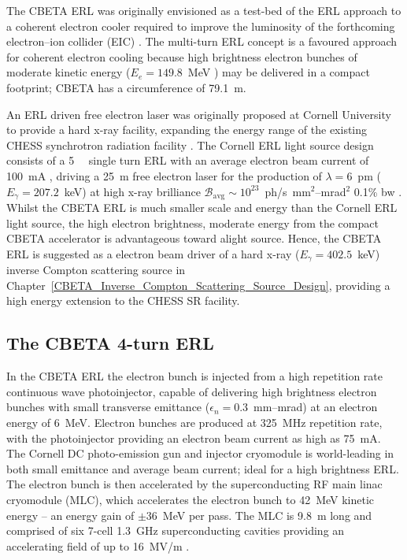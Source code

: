 \documentclass[../main.tex]{subfiles}
\begin{document}
The CBETA ERL was originally envisioned as a test-bed of the ERL approach to a coherent electron cooler \cite{derbenev1991coherent,litvinenko2009coherent} required to improve the luminosity of the forthcoming electron--ion collider (EIC) \cite{willeke2021electron}. The multi-turn ERL concept is a favoured approach for coherent electron cooling because high brightness electron bunches of moderate kinetic energy ($E_{e} = 149.8$~\si{\mega\electronvolt} \cite{willeke2021electron}) may be delivered in a compact footprint; CBETA has a circumference of 79.1~\si{\meter}. 

An ERL driven free electron laser \cite{bazarov2003lattice,gruner2001study,bilderback2006status} was originally proposed at Cornell University to provide a hard x-ray facility, expanding the energy range of the existing CHESS synchrotron radiation facility \cite{batterman1979chess,CHESSstructuralmaterialsbeamline}. The Cornell ERL light source design consists of a 5~\si{\giga\electonvolt} single turn ERL with an average electron beam current of 100~\si{\milli\ampere} \cite{bazarov2003lattice,gruner2001study,bilderback2006status}, driving a 25~\si{\meter} free electron laser for the production of $\lambda = 6$~\si{\pico\meter} ($E_{\gamma} = 207.2$~\si{\kilo\electronvolt}) at high x-ray brilliance $\mathcal{B}_{\mathrm{avg}}\sim 10^{23}$~ph/\si{\second}~\si{\milli\meter}$^{2}$--\si{\milli\radian}$^{2}$ 0.1\% bw \cite{bilderback2006status}. Whilst the CBETA ERL is much smaller scale and energy than the Cornell ERL light source, the high electron brightness, moderate energy from the compact CBETA accelerator is advantageous toward alight source. Hence, the CBETA ERL is suggested as a electron beam driver of a hard x-ray ($E_{\gamma} = 402.5$~\si{\kilo\electronvolt}) inverse Compton scattering source in Chapter~\ref{CBETA_Inverse_Compton_Scattering_Source_Design}, providing a high energy extension to the CHESS SR facility.

\subsection{The CBETA 4-turn ERL}

In the CBETA ERL the electron bunch is injected from a high repetition rate continuous wave photoinjector, capable of delivering high brightness electron bunches with small transverse emittance ($\epsilon_{n} = 0.3$~\si{\milli\meter}--\si{\milli\radian}) at an electron energy of 6~\si{\mega\electronvolt}. Electron bunches are produced at 325~\si{\mega\hertz} repetition rate, with the photoinjector providing an electron beam current as high as 75~\si{\milli\ampere}. The Cornell DC photo-emission gun and injector cryomodule is world-leading in both small emittance and average beam current; ideal for a high brightness ERL. The electron bunch is then accelerated by the superconducting RF main linac cryomodule (MLC), which accelerates the electron bunch to 42~\si{\mega\electronvolt} kinetic energy -- an energy gain of $\pm 36$~\si{\mega\electronvolt} per pass. The MLC is 9.8~\si{\meter} long and comprised of six 7-cell 1.3~\si{\giga\hertz} superconducting cavities providing an accelerating field of up to 16~\si{\mega\volt}/\si{\meter} \cite{hoffstaetter2017cbeta}.
\end{document}
